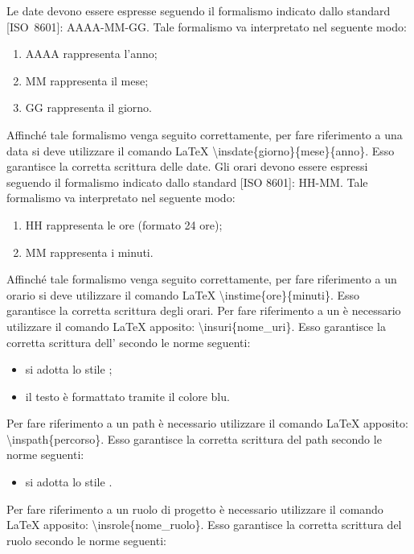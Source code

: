 				 \label{sec:formatiricorrenti}
					\label{sec:formatoDate}
						Le date devono essere espresse seguendo il formalismo indicato dallo standard [ISO~8601]: AAAA-MM-GG. Tale formalismo va interpretato nel seguente modo:
						\begin{enumerate}
							\item AAAA rappresenta l’anno;
							\item MM rappresenta il mese;
							\item GG rappresenta il giorno.
						\end{enumerate}
						Affinché tale formalismo venga seguito correttamente, per fare riferimento a una data si deve utilizzare il comando \LaTeX{} \textbackslash insdate\{giorno\}\{mese\}\{anno\}. Esso garantisce la corretta scrittura delle date.
						Gli orari devono essere espressi seguendo il formalismo indicato dallo standard [ISO 8601]: HH-MM. Tale formalismo va interpretato nel seguente modo:
						\begin{enumerate}
							\item HH rappresenta le ore (formato 24 ore);
							\item MM rappresenta i minuti.
						\end{enumerate}
						Affinché tale formalismo venga seguito correttamente, per fare riferimento a un orario si deve utilizzare il comando \LaTeX{} \textbackslash instime\{ore\}\{minuti\}. Esso garantisce la corretta scrittura degli orari.
						Per fare riferimento a un  è necessario utilizzare il comando \LaTeX{} apposito: \textbackslash insuri\{nome\_uri\}. Esso garantisce la corretta scrittura dell' secondo le norme seguenti:
						\begin{itemize}
							\item si adotta lo stile ;
							\item il testo è formattato tramite il colore blu.
						\end{itemize}
						Per fare riferimento a un path è necessario utilizzare il comando \LaTeX{} apposito: \textbackslash inspath\{percorso\}. Esso garantisce la corretta scrittura del path secondo le norme seguenti:
						\begin{itemize}
							\item si adotta lo stile .
						\end{itemize}
						Per fare riferimento a un ruolo di progetto è necessario utilizzare il comando \LaTeX{} apposito: \textbackslash insrole\{nome\_ruolo\}. Esso garantisce la corretta scrittura del ruolo secondo le norme seguenti:
